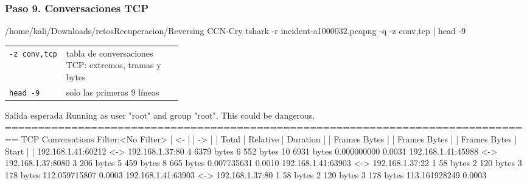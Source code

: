 \documentclass[11pt,a4paper]{article}
\begin{document}
\subsubsection*{Paso 9. Conversaciones TCP}
\begin{comando}{/home/kali/Downloads/retosRecuperacion/Reversing CCN-Cry}
tshark -r incident-a1000032.pcapng -q -z conv,tcp | head -9
\end{comando}
\begin{tcolorbox}[enhanced, breakable, colback=white, colframe=gray!40, boxrule=0.3pt, arc=1pt, left=4pt, right=4pt, top=2pt, bottom=2pt, fonttitle=\sffamily\scriptsize\bfseries, coltitle=black!75, colbacktitle=gray!8, title={Qué hace cada parte}, attach title to upper, before skip=2pt, after skip=4pt, fontupper=\small]
\par{\renewcommand{\arraystretch}{1.12}\begin{tabularx}{\linewidth}{@{}>{\raggedright\arraybackslash}p{0.33\linewidth}>{\raggedright\arraybackslash}X@{}}
\texttt{-z conv,\allowbreak{}tcp} & tabla de conversaciones TCP: extremos, tramas y bytes \\
\texttt{head -9} & solo las primeras 9 líneas \\
\end{tabularx}}
\end{tcolorbox}
\begin{salidan}{Salida esperada}
Running as user "root" and group "root". This could be dangerous.
================================================================================
TCP Conversations
Filter:<No Filter>
                                                           |       <-      | |       ->      | |     Total     |    Relative    |   Duration   |
                                                           | Frames  Bytes | | Frames  Bytes | | Frames  Bytes |      Start     |              |
192.168.1.41:60212         <-> 192.168.1.37:80                  4 6379 bytes       6 552 bytes      10 6931 bytes     0.000000000         0.0031
192.168.1.41:45988         <-> 192.168.1.37:8080                3 206 bytes       5 459 bytes       8 665 bytes     0.007735631         0.0010
192.168.1.41:63903         <-> 192.168.1.37:22                  1 58 bytes        2 120 bytes       3 178 bytes   112.059715807         0.0003
192.168.1.41:63903         <-> 192.168.1.37:80                  1 58 bytes        2 120 bytes       3 178 bytes   113.161928249         0.0003
\end{salidan}
\end{document}
